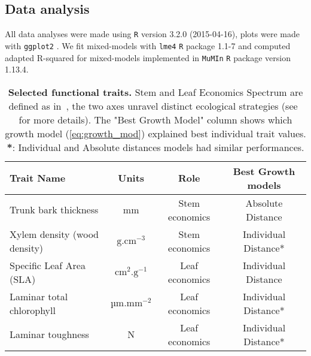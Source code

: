 \subsection*{Data analysis}

All data analyses were made using \texttt{R} \citep{R_language} version 3.2.0 (2015-04-16), plots were made with \texttt{ggplot2} \citep{ggplot2_pkg}. We fit mixed-models with \texttt{lme4} \texttt{R} package \citep{lme4_pkg} 1.1-7 and computed adapted R-squared for mixed-models \citep{nakagawa_general_2013} implemented in \texttt{MuMIn} \texttt{R} package \citep{mumin_pkg} version 1.13.4.

\begin{table}
	\begin{center}
		\begin{tabular}{lccc}
		\hline \hline
		Trait Name & Units & Role & Best Growth models \\
		\hline
		Trunk bark thickness & mm & Stem economics & Absolute Distance\\
		Xylem density (wood density) & $\text{g}.\text{cm}^{-3}$ & Stem economics & Individual Distance* \\
		Specific Leaf Area (SLA) & $\text{cm}^2.\text{g}^{-1}$ & Leaf economics & Individual Distance\\
		Laminar total chlorophyll & $\text{µm}.\text{mm}^{-2}$  & Leaf economics & Individual Distance*\\
		Laminar toughness & N & Leaf economics & Individual Distance*\\
		\hline \hline
		\end{tabular}
		\caption{\textbf{Selected functional traits.} Stem and Leaf Economics Spectrum are defined as in~\citep{baraloto_decoupled_2010}, the two axes unravel distinct ecological strategies (see~ for more details). The "Best Growth Model" column shows which growth model (\autoref{eq:growth_mod}) explained best individual trait values. \textbf{*}: Individual and Absolute distances models had similar performances.} 
		\label{tab:seltraits}
	\end{center}
\end{table}
